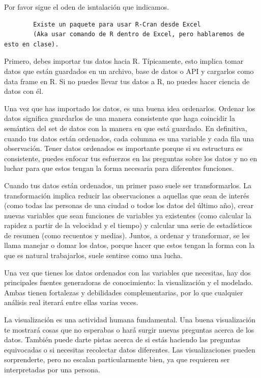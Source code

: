 \documentclass[]{article}
\begin{document}
Por favor sigue el oden de isntalación que indicamos.

\begin{verbatim}
        Existe un paquete para usar R-Cran desde Excel 
        (Aka usar comando de R dentro de Excel, pero hablaremos de esto en clase).
\end{verbatim}

Primero, debes importar tus datos hacia R. Típicamente, esto implica
tomar datos que están guardados en un archivo, base de datos o API y
cargarlos como data frame en R. Si no puedes llevar tus datos a R, no
puedes hacer ciencia de datos con él.

Una vez que has importado los datos, es una buena idea ordenarlos.
Ordenar los datos significa guardarlos de una manera consistente que
haga coincidir la semántica del set de datos con la manera en que está
guardado. En definitiva, cuando tus datos están ordenados, cada columna
es una variable y cada fila una observación. Tener datos ordenados es
importante porque si su estructura es consistente, puedes enfocar tus
esfuerzos en las preguntas sobre los datos y no en luchar para que estos
tengan la forma necesaria para diferentes funciones.

Cuando tus datos están ordenados, un primer paso suele ser
transformarlos. La transformación implica reducir las observaciones a
aquellas que sean de interés (como todas las personas de una ciudad o
todos los datos del último año), crear nuevas variables que sean
funciones de variables ya existentes (como calcular la rapidez a partir
de la velocidad y el tiempo) y calcular una serie de estadísticos de
resumen (como recuentos y medias). Juntos, a ordenar y transformar, se
les llama manejar o domar los datos, porque hacer que estos tengan la
forma con la que es natural trabajarlos, suele sentirse como una lucha.

Una vez que tienes los datos ordenados con las variables que necesitas,
hay dos principales fuentes generadoras de conocimiento: la
visualización y el modelado. Ambas tienen fortalezas y debilidades
complementarias, por lo que cualquier análisis real iterará entre ellas
varias veces.

La visualización es una actividad humana fundamental. Una buena
visualización te mostrará cosas que no esperabas o hará surgir nuevas
preguntas acerca de los datos. También puede darte pistas acerca de si
estás haciendo las preguntas equivocadas o si necesitas recolectar datos
diferentes. Las visualizaciones pueden sorprenderte, pero no escalan
particularmente bien, ya que requieren ser interpretadas por una
persona.
\end{document}
